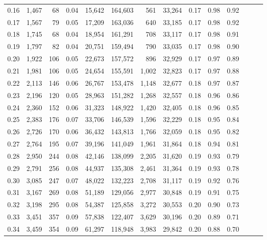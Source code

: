 \begin{tabular}{rrrrrrrrrrrrrr}
0.16 &  1,467 &   68 &  0.04 &   15,642 &  164,603 &     561 &  33,264 &  0.17 &  0.98 &      0.92 \\
0.17 &  1,567 &   79 &  0.05 &   17,209 &  163,036 &     640 &  33,185 &  0.17 &  0.98 &      0.92 \\
0.18 &  1,745 &   68 &  0.04 &   18,954 &  161,291 &     708 &  33,117 &  0.17 &  0.98 &      0.91 \\
0.19 &  1,797 &   82 &  0.04 &   20,751 &  159,494 &     790 &  33,035 &  0.17 &  0.98 &      0.90 \\
0.20 &  1,922 &  106 &  0.05 &   22,673 &  157,572 &     896 &  32,929 &  0.17 &  0.97 &      0.89 \\
0.21 &  1,981 &  106 &  0.05 &   24,654 &  155,591 &   1,002 &  32,823 &  0.17 &  0.97 &      0.88 \\
0.22 &  2,113 &  146 &  0.06 &   26,767 &  153,478 &   1,148 &  32,677 &  0.18 &  0.97 &      0.87 \\
0.23 &  2,196 &  120 &  0.05 &   28,963 &  151,282 &   1,268 &  32,557 &  0.18 &  0.96 &      0.86 \\
0.24 &  2,360 &  152 &  0.06 &   31,323 &  148,922 &   1,420 &  32,405 &  0.18 &  0.96 &      0.85 \\
0.25 &  2,383 &  176 &  0.07 &   33,706 &  146,539 &   1,596 &  32,229 &  0.18 &  0.95 &      0.84 \\
0.26 &  2,726 &  170 &  0.06 &   36,432 &  143,813 &   1,766 &  32,059 &  0.18 &  0.95 &      0.82 \\
0.27 &  2,764 &  195 &  0.07 &   39,196 &  141,049 &   1,961 &  31,864 &  0.18 &  0.94 &      0.81 \\
0.28 &  2,950 &  244 &  0.08 &   42,146 &  138,099 &   2,205 &  31,620 &  0.19 &  0.93 &      0.79 \\
0.29 &  2,791 &  256 &  0.08 &   44,937 &  135,308 &   2,461 &  31,364 &  0.19 &  0.93 &      0.78 \\
0.30 &  3,085 &  247 &  0.07 &   48,022 &  132,223 &   2,708 &  31,117 &  0.19 &  0.92 &      0.76 \\
0.31 &  3,167 &  269 &  0.08 &   51,189 &  129,056 &   2,977 &  30,848 &  0.19 &  0.91 &      0.75 \\
0.32 &  3,198 &  295 &  0.08 &   54,387 &  125,858 &   3,272 &  30,553 &  0.20 &  0.90 &      0.73 \\
0.33 &  3,451 &  357 &  0.09 &   57,838 &  122,407 &   3,629 &  30,196 &  0.20 &  0.89 &      0.71 \\
0.34 &  3,459 &  354 &  0.09 &   61,297 &  118,948 &   3,983 &  29,842 &  0.20 &  0.88 &      0.70 \\

\end{tabular}
